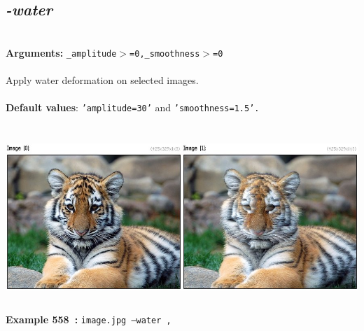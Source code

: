 \documentclass[a4paper,11pt,twoside]{book}
\begin{document}
\subsection{\emph{-water} }\vspace*{-0.5em}
~\\\textbf{Arguments: } 
{\small \texttt{\_amplitude$>$=0,\_smoothness$>$=0}}\\~\\
Apply water deformation on selected images.
~\\~\\\textbf{Default values}: {\small \texttt{'amplitude=30'} and \texttt{'smoothness=1.5'.}}
\begin{center}\includegraphics[keepaspectratio=true,height=7cm,width=\textwidth]{img/gmic_def558.jpg}\\
{\footnotesize \textbf{Example 558~:} \texttt{image.jpg --water ,}}
\end{center}
\end{document}
